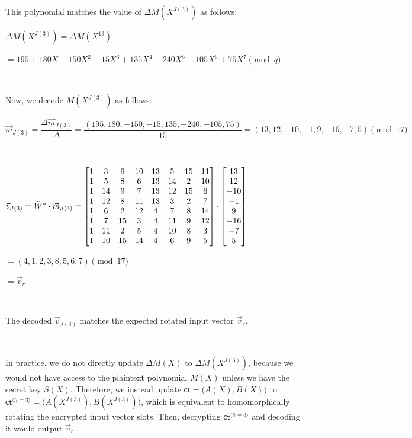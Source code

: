 This polynomial matches the value of $\Delta M(X^{J(3)})$ as follows:

$\Delta M(X^{J(3)}) = \Delta M(X^{13}) $

$= 195 + 180X - 150X^2 - 15X^3 + 135X^4 - 240X^5 - 105X^6 + 75X^7 \pmod{q}$

$ $




Now, we decode $M(X^{J(3)})$ as follows: 

$\vec{m}_{J(3)} = \dfrac{\Delta \vec{m}_{J(3)}}{\Delta} = \dfrac{(195, 180, -150, -15, 135, -240, -105, 75)}{15} = (13, 12, -10, -1, 9, -16, -7, 5) \pmod{17}$

$ $


$\vec{v}_{J(3)} = \tilde{W}^* \cdot \vec{m}_{J(3)} = \begin{bmatrix}
1&3&9&10&13&5&15&11\\
1&5&8&6&13&14&2&10\\
1&14&9&7&13&12&15&6\\
1&12&8&11&13&3&2&7\\
1&6&2&12&4&7&8&14\\
1&7&15&3&4&11&9&12\\
1&11&2&5&4&10&8&3\\
1&10&15&14&4&6&9&5\\
\end{bmatrix} \cdot \begin{bmatrix}
13\\
12\\
-10\\
-1\\
9\\
-16\\
-7\\
5\end{bmatrix}$

$= (4, 1, 2, 3, 8, 5, 6, 7) \pmod{17}$

$= \vec{v}_r$

$ $

The decoded $\vec{v}_{J(3)}$ matches the expected rotated input vector $\vec{v}_r$.  


$ $

In practice, we do not directly update $\Delta M(X)$ to $\Delta M(X^{J(3)})$, because we would not have access to the plaintext polynomial $M(X)$ unless we have the secret key $S(X)$. Therefore, we instead update $\textsf{ct}=\bm(A(X), B(X)\bm)$ to $\textsf{ct}^{\langle h=3 \rangle}=\bm(A(X^{J(3)}), B(X^{J(3)})\bm)$, which is equivalent to homomorphically rotating the encrypted input vector slots. Then, decrypting $\textsf{ct}^{\langle h=3 \rangle}$ and decoding it would output $\vec{v}_r$.

